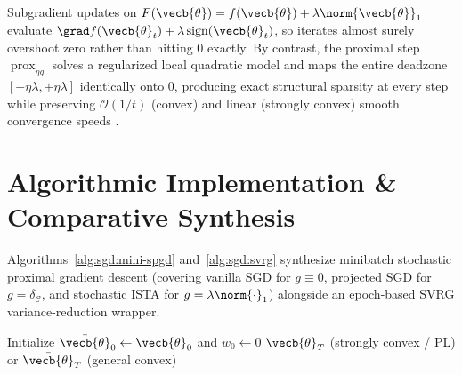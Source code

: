 \documentclass[../../../../master.tex]{subfiles}
\begin{document}
\begin{intuition}
Subgradient updates on $F(\vecb{\theta}) = f(\vecb{\theta}) + \lambda\norm{\vecb{\theta}}_1$ evaluate $\grad f(\vecb{\theta}_t) + \lambda\operatorname{sign}(\vecb{\theta}_t)$, so iterates almost surely overshoot zero rather than hitting $0$ exactly. By contrast, the proximal step $\operatorname{prox}_{\eta g}$ solves a regularized local quadratic model and maps the entire deadzone $[-\eta\lambda, +\eta\lambda]$ identically onto $0$, producing exact structural sparsity at every step while preserving $\mathcal{O}(1/t)$ (convex) and linear (strongly convex) smooth convergence speeds .
\end{intuition}

\section{Algorithmic Implementation \& Comparative Synthesis}
\label{sec:sgd:algorithms}

Algorithms~\ref{alg:sgd:mini-spgd} and~\ref{alg:sgd:svrg} synthesize minibatch stochastic proximal gradient descent (covering vanilla SGD for $g \equiv 0$, projected SGD for $g = \delta_{\mathcal{C}}$, and stochastic ISTA for $g = \lambda\norm{\cdot}_1$) alongside an epoch-based SVRG variance-reduction wrapper.

\begin{algorithm}[htbp]
\caption{Minibatch Stochastic Proximal Gradient Descent (Mini-SPGD / Stochastic ISTA)}
\label{alg:sgd:mini-spgd}
Initialize $\bar{\vecb{\theta}}_0 \leftarrow \vecb{\theta}_0$ and $w_0 \leftarrow 0$\;
\Return $\vecb{\theta}_T$ (strongly convex / PL) or $\bar{\vecb{\theta}}_T$ (general convex)\;
\end{algorithm}
\end{document}
